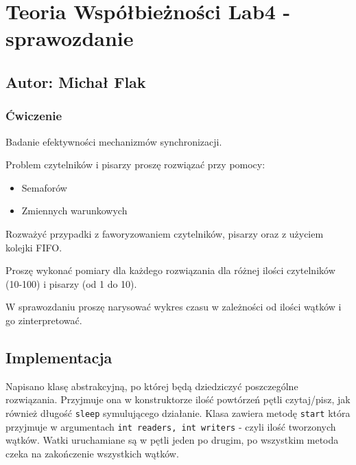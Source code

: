 \documentclass[
]{article}
\author{}
\date{\vspace{-2.5em}}
\providecommand{\tightlist}{%
  \setlength{\itemsep}{0pt}\setlength{\parskip}{0pt}}
\begin{document}
\hypertarget{teoria-wspuxf3ux142bieux17cnoux15bci-lab4---sprawozdanie}{%
\section{Teoria Współbieżności Lab4 -
sprawozdanie}\label{teoria-wspuxf3ux142bieux17cnoux15bci-lab4---sprawozdanie}}

\hypertarget{autor-michaux142-flak}{%
\subsection{Autor: Michał Flak}\label{autor-michaux142-flak}}

\hypertarget{ux107wiczenie}{%
\subsubsection{Ćwiczenie}\label{ux107wiczenie}}

Badanie efektywności mechanizmów synchronizacji.

Problem czytelników i pisarzy proszę rozwiązać przy pomocy:

\begin{itemize}
\tightlist
\item
  Semaforów
\item
  Zmiennych warunkowych
\end{itemize}

Rozważyć przypadki z faworyzowaniem czytelników, pisarzy oraz z użyciem
kolejki FIFO.

Proszę wykonać pomiary dla każdego rozwiązania dla różnej ilości
czytelników (10-100) i pisarzy (od 1 do 10).

W sprawozdaniu proszę narysować wykres czasu w zależności od ilości
wątków i go zinterpretować.

\hypertarget{implementacja}{%
\subsection{Implementacja}\label{implementacja}}

Napisano klasę abstrakcyjną, po której będą dziedziczyć poszczególne
rozwiązania. Przyjmuje ona w konstruktorze ilość powtórzeń pętli
czytaj/pisz, jak również długość \texttt{sleep} symulującego działanie.
Klasa zawiera metodę \texttt{start} która przyjmuje w argumentach
\texttt{int\ readers,\ int\ writers} - czyli ilość tworzonych wątków.
Watki uruchamiane są w pętli jeden po drugim, po wszystkim metoda czeka
na zakończenie wszystkich wątków.
\end{document}

